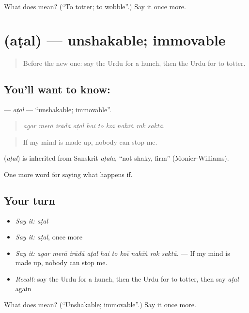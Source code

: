 \begin{tcolorbox}[breakable,colback=teal!4,colframe=teal!35!black,title={Before you move on}]
What does  mean? (\textquotedblleft{}To totter; to wobble\textquotedblright{}.) Say it once more.
\end{tcolorbox}
\section[\texorpdfstring{\ur{اٹل} (aṭal)}{اٹل (aṭal)}]{ (aṭal) — unshakable; immovable}

\label{lesson:UR-C538-atal}



\begin{quote}
Before the new one: say the Urdu for a hunch, then the Urdu for to totter.
\end{quote}

\subsection*{You'll want to know: }
\textbf{} — \emph{aṭal} — \textquotedblleft{}unshakable; immovable\textquotedblright{}.

\begin{quote}
         
\end{quote}

\begin{quote}
\emph{agar merā irādā aṭal hai to koī nahīṅ rok saktā.}
\end{quote}

\begin{quote}
If my mind is made up, nobody can stop me.
\end{quote}

\begin{cousinweb}
\textbf{} (\emph{aṭal}) is inherited from Sanskrit \emph{aṭala}, \textquotedblleft{}not shaky, firm\textquotedblright{} (Monier-Williams).
\end{cousinweb}

\begin{grammarlens}[title={What you've built}]
One more word for saying what happens if.
\end{grammarlens}

\subsection*{Your turn}
\begin{itemize}
\raggedright
  \item \emph{Say it:} \emph{aṭal}
  \item \emph{Say it:} \emph{aṭal}, once more
  \item \emph{Say it:} \emph{agar merā irādā aṭal hai to koī nahīṅ rok saktā.} — If my mind is made up, nobody can stop me.
  \item \emph{Recall:} say the Urdu for a hunch, then the Urdu for to totter, then say \emph{aṭal} again
\end{itemize}

\begin{tcolorbox}[breakable,colback=teal!4,colframe=teal!35!black,title={Before you move on}]
What does  mean? (\textquotedblleft{}Unshakable; immovable\textquotedblright{}.) Say it once more.
\end{tcolorbox}
